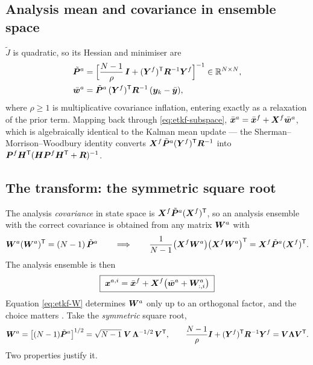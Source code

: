 \subsection{Analysis mean and covariance in ensemble space}
$\tilde J$ is quadratic, so its Hessian and minimiser are
\begin{align}
  \tilde{\bm{P}}^a &= \Big[\frac{N-1}{\rho}\,\bm{I} + (\bm{Y}^f)^{\mathsf{T}}\bm{R}^{-1}\bm{Y}^f\Big]^{-1} \in \mathbb{R}^{N\times N},
  \label{eq:etkf-Pa}\\
  \bar{\bm w}^a &= \tilde{\bm{P}}^a\,(\bm{Y}^f)^{\mathsf{T}}\bm{R}^{-1}\,(\bm{y}_k - \bar{\bm{y}}),
  \label{eq:etkf-wbar}
\end{align}
where $\rho\ge 1$ is multiplicative covariance inflation, entering exactly as a relaxation of the
prior term.  Mapping back through \eqref{eq:etkf-subspace},
$\bar{\bm{x}}^a = \bar{\bm{x}}^f + \bm{X}^f\bar{\bm w}^a$, which is algebraically identical to the Kalman
mean update --- the Sherman--Morrison--Woodbury identity converts
$\bm{X}^f\tilde{\bm{P}}^a(\bm{Y}^f)^{\mathsf{T}}\bm{R}^{-1}$ into $\bm{P}^f\bm{H}^{\mathsf{T}}(\bm{H}\bm{P}^f\bm{H}^{\mathsf{T}}+\bm{R})^{-1}$.

\subsection{The transform: the symmetric square root}
The analysis \emph{covariance} in state space is $\bm{X}^f\tilde{\bm{P}}^a(\bm{X}^f)^{\mathsf{T}}$, so an analysis
ensemble with the correct covariance is obtained from any matrix $\bm{W}^a$ with
\begin{equation}
  \bm{W}^a(\bm{W}^a)^{\mathsf{T}} = (N-1)\,\tilde{\bm{P}}^a
  \qquad\Longrightarrow\qquad
  \frac{1}{N-1}\big(\bm{X}^f\bm{W}^a\big)\big(\bm{X}^f\bm{W}^a\big)^{\mathsf{T}} = \bm{X}^f\tilde{\bm{P}}^a(\bm{X}^f)^{\mathsf{T}} .
  \label{eq:etkf-W}
\end{equation}
The analysis ensemble is then
\begin{equation}
  \boxed{\;
  \bm{x}^{a,i} = \bar{\bm{x}}^f + \bm{X}^f\big(\bar{\bm w}^a + \bm{W}^a_{:,i}\big)\;}
  \label{eq:etkf-analysis}
\end{equation}
Equation \eqref{eq:etkf-W} determines $\bm{W}^a$ only up to an orthogonal factor, and the choice
matters \cite{tippett2003srf}.  Take the \emph{symmetric} square root,
\begin{equation}
  \bm{W}^a = \big[(N-1)\tilde{\bm{P}}^a\big]^{1/2}
        = \sqrt{N-1}\; \bm{V}\, \bm\Lambda^{-1/2}\,\bm{V}^{\mathsf{T}},
  \qquad
  \frac{N-1}{\rho}\bm{I} + (\bm{Y}^f)^{\mathsf{T}}\bm{R}^{-1}\bm{Y}^f = \bm{V}\bm\Lambda\bm{V}^{\mathsf{T}} .
  \label{eq:etkf-sqrt}
\end{equation}
Two properties justify it.

